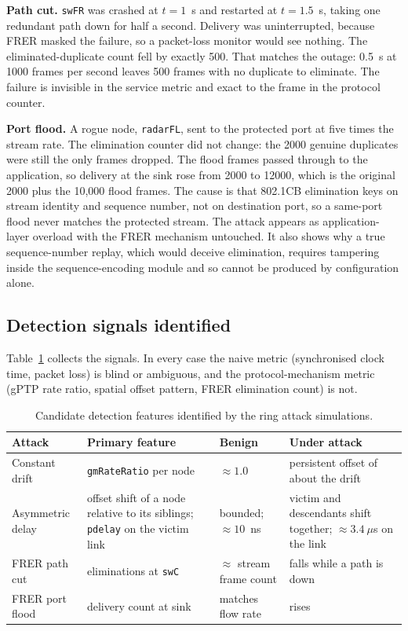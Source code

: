 \textbf{Path cut.} \texttt{swFR} was crashed at $t=1$~s and restarted at $t=1.5$~s,
taking one redundant path down for half a second. Delivery was uninterrupted, because
FRER masked the failure, so a packet-loss monitor would see nothing. The eliminated-duplicate
count fell by exactly 500. That matches the outage: 0.5~s at 1000 frames per second leaves
500 frames with no duplicate to eliminate. The failure is invisible in the service metric and
exact to the frame in the protocol counter.

\textbf{Port flood.} A rogue node, \texttt{radarFL}, sent to the protected port at five
times the stream rate. The elimination counter did not change: the 2000 genuine duplicates
were still the only frames dropped. The flood frames passed through to the application,
so delivery at the sink rose from 2000 to 12000, which is the original 2000 plus the
10{,}000 flood frames. The cause is that 802.1CB elimination keys on stream identity and
sequence number, not on destination port, so a same-port flood never matches the protected
stream. The attack appears as application-layer overload with the FRER mechanism
untouched. It also shows why a true sequence-number replay, which would deceive
elimination, requires tampering inside the sequence-encoding module and so cannot be
produced by configuration alone.

\subsection{Detection signals identified}

Table~\ref{tab:ring-signals} collects the signals. In every case the naive metric
(synchronised clock time, packet loss) is blind or ambiguous, and the protocol-mechanism
metric (gPTP rate ratio, spatial offset pattern, FRER elimination count) is not.

\begin{table}[htbp]
\centering
\caption{Candidate detection features identified by the ring attack simulations.}
\label{tab:ring-signals}
\vspace{0.8em}
\small\setlength{\tabcolsep}{4pt}
\begin{tabular}{>{\raggedright\arraybackslash}p{} >{\raggedright\arraybackslash}p{} >{\raggedright\arraybackslash}p{} >{\raggedright\arraybackslash}p{}}
\toprule
\textbf{Attack} & \textbf{Primary feature} & \textbf{Benign} & \textbf{Under attack} \\
\midrule
Constant drift & \texttt{gmRateRatio} per node & $\approx 1.0$ & persistent offset of about the drift \\
Asymmetric delay & offset shift of a node relative to its siblings; \texttt{pdelay} on the victim link & bounded; $\approx 10$~ns & victim and descendants shift together; $\approx 3.4~\mu$s on the link \\
FRER path cut & eliminations at \texttt{swC} & $\approx$ stream frame count & falls while a path is down \\
FRER port flood & delivery count at sink & matches flow rate & rises \\
\bottomrule
\end{tabular}
\end{table}

